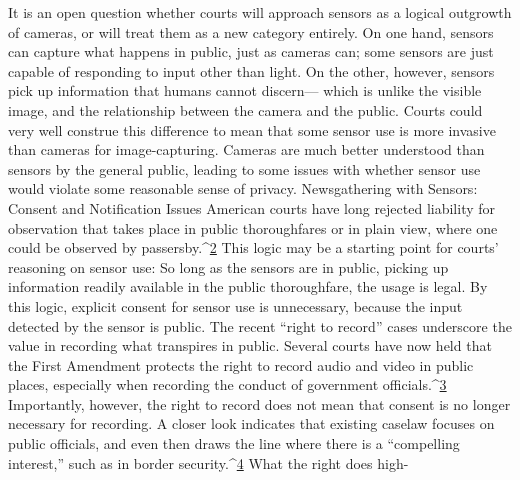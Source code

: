 It is an open question whether courts will approach sensors as a logical
outgrowth of cameras, or will treat them as a new category entirely. On
one hand, sensors can capture what happens in public, just as cameras can;
some sensors are just capable of responding to input other than light. On
the other, however, sensors pick up information that humans cannot discern—
which is unlike the visible image, and the relationship between the
camera and the public. Courts could very well construe this difference to
mean that some sensor use is more invasive than cameras for image-capturing.
Cameras are much better understood than sensors by the general
public, leading to some issues with whether sensor use would violate some
reasonable sense of privacy.
Newsgathering with Sensors:
Consent and Notification Issues
American courts have long rejected liability for observation that takes place
in public thoroughfares or in plain view, where one could be observed by
passersby.^{\href{#endnotes-syed}{2}} This logic may be a starting point for courts' reasoning on sensor
use: So long as the sensors are in public, picking up information readily
available in the public thoroughfare, the usage is legal. By this logic, explicit
consent for sensor use is unnecessary, because the input detected by the
sensor is public. The recent ``right to record'' cases underscore the value in
recording what transpires in public. Several courts have now held that the
First Amendment protects the right to record audio and video in public
places, especially when recording the conduct of government officials.^{\href{#endnotes-syed}{3}}
Importantly, however, the right to record does not mean that consent is no
longer necessary for recording. A closer look indicates that existing caselaw
focuses on public officials, and even then draws the line where there is a
``compelling interest,'' such as in border security.^{\href{#endnotes-syed}{4}} What the right does high-


